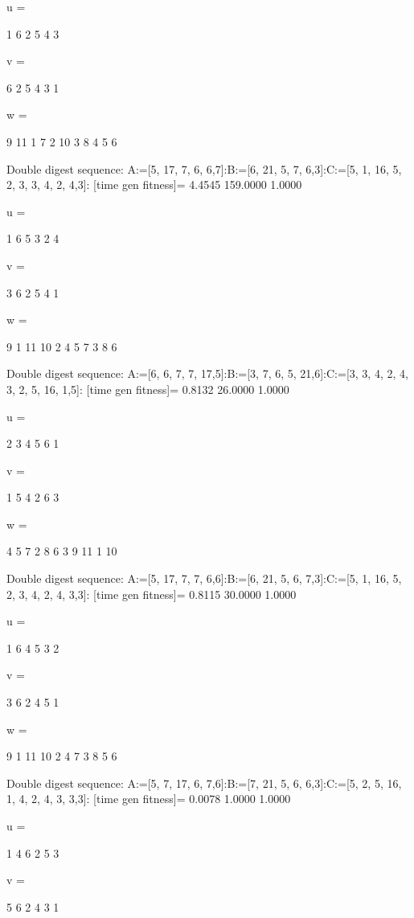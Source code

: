 u =

     1     6     2     5     4     3


v =

     6     2     5     4     3     1


w =

     9    11     1     7     2    10     3     8     4     5     6

Double digest sequence:
A:=[5, 17, 7, 6, 6,7]:B:=[6, 21, 5, 7, 6,3]:C:=[5, 1, 16, 5, 2, 3, 3, 4, 2, 4,3]:
[time gen fitness]=
    4.4545  159.0000    1.0000


u =

     1     6     5     3     2     4


v =

     3     6     2     5     4     1


w =

     9     1    11    10     2     4     5     7     3     8     6

Double digest sequence:
A:=[6, 6, 7, 7, 17,5]:B:=[3, 7, 6, 5, 21,6]:C:=[3, 3, 4, 2, 4, 3, 2, 5, 16, 1,5]:
[time gen fitness]=
    0.8132   26.0000    1.0000


u =

     2     3     4     5     6     1


v =

     1     5     4     2     6     3


w =

     4     5     7     2     8     6     3     9    11     1    10

Double digest sequence:
A:=[5, 17, 7, 7, 6,6]:B:=[6, 21, 5, 6, 7,3]:C:=[5, 1, 16, 5, 2, 3, 4, 2, 4, 3,3]:
[time gen fitness]=
    0.8115   30.0000    1.0000


u =

     1     6     4     5     3     2


v =

     3     6     2     4     5     1


w =

     9     1    11    10     2     4     7     3     8     5     6

Double digest sequence:
A:=[5, 7, 17, 6, 7,6]:B:=[7, 21, 5, 6, 6,3]:C:=[5, 2, 5, 16, 1, 4, 2, 4, 3, 3,3]:
[time gen fitness]=
    0.0078    1.0000    1.0000


u =

     1     4     6     2     5     3


v =

     5     6     2     4     3     1



